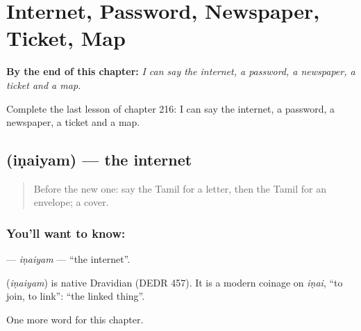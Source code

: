 
\chapter{Internet, Password, Newspaper, Ticket, Map}
\label{ch:ta-internet-password-newspaper-ticket-map}

\begin{chapteropening}
\textbf{By the end of this chapter:} \emph{I can say the internet, a password, a newspaper, a ticket and a map.}

Complete the last lesson of chapter 216: I can say the internet, a password, a newspaper, a ticket and a map.
\end{chapteropening}

\section[\texorpdfstring{\ta{இணையம்} (iṇaiyam)}{இணையம் (iṇaiyam)}]{ (iṇaiyam) — the internet}

\label{lesson:TA-C216-inaiyam}



\begin{quote}
Before the new one: say the Tamil for a letter, then the Tamil for an envelope; a cover.
\end{quote}

\subsection*{You'll want to know: }
\textbf{} — \emph{iṇaiyam} — \textquotedblleft{}the internet\textquotedblright{}.

\begin{cousinweb}
\textbf{} (\emph{iṇaiyam}) is native Dravidian (DEDR 457). It is a modern coinage on \emph{iṇai}, \textquotedblleft{}to join, to link\textquotedblright{}: \textquotedblleft{}the linked thing\textquotedblright{}.
\end{cousinweb}

\begin{grammarlens}[title={What you've built}]
One more word for this chapter.
\end{grammarlens}


